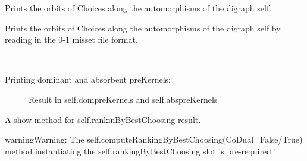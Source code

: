\documentclass[letterpaper,10pt,english]{sphinxmanual}
\begin{document}
\begin{fulllineitems}

\begin{fulllineitems}
\label{techDoc:digraphs.Digraph.showOrbits}
Prints the orbits of Choices along the automorphisms of
the digraph self.

\end{fulllineitems}


\begin{fulllineitems}
\label{techDoc:digraphs.Digraph.showOrbitsFromFile}
Prints the orbits of Choices along the automorphisms of
the digraph self by reading in the 0-1 misset file format.

\end{fulllineitems}


\begin{fulllineitems}
\label{techDoc:digraphs.Digraph.showPreKernels}~\begin{description}
\item[{Printing dominant and absorbent preKernels:}] \leavevmode
Result in self.dompreKernels and self.abspreKernels

\end{description}

\end{fulllineitems}


\begin{fulllineitems}
\label{techDoc:digraphs.Digraph.showRankingByBestChoosing}
A show method for self.rankinByBestChoosing result.

\begin{notice}{warning}{Warning:}
The self.computeRankingByBestChoosing(CoDual=False/True) method instantiating the self.rankingByBestChoosing slot is pre-required !
\end{notice}

\end{fulllineitems}


\end{fulllineitems}
\end{document}
